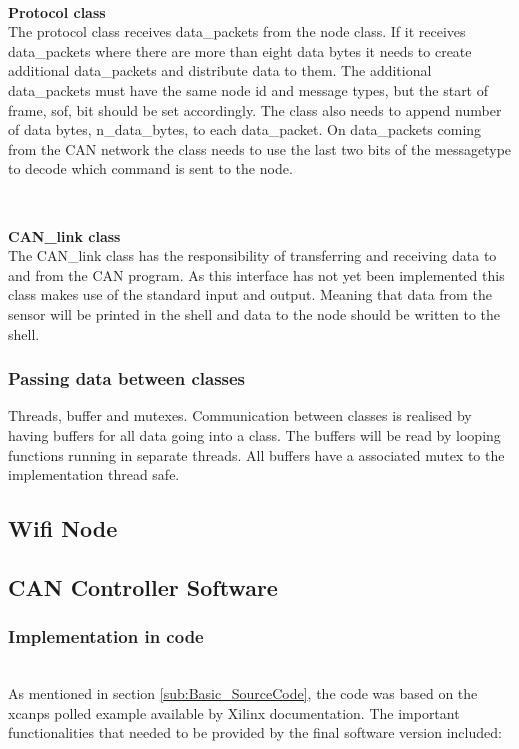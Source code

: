 ~\\ \par \textbf{Protocol class} ~ \\
The protocol class receives data\_packets from the node class. 
If it receives data\_packets where there are more than eight data bytes it needs to create additional data\_packets and distribute data to them. 
The additional data\_packets must have the same node id and message types, but the start of frame, sof, bit should be set accordingly.
The class also needs to append number of data bytes, n\_data\_bytes, to each data\_packet.
On data\_packets coming from the CAN network the class needs to use the last two bits of the messagetype to decode which command is sent to the node.

~\\ \par \textbf{CAN\_link class} ~ \\
The CAN\_link class has the responsibility of transferring and receiving data to and from the CAN program.
As this interface has not yet been implemented this class makes use of the standard input and output. 
Meaning that data from the sensor will be printed in the shell and data to the node should be written to the shell. 

\subsubsection*{Passing data between classes}
Threads, buffer and mutexes.
Communication between classes is realised by having buffers for all data going into a class.
The buffers will be read by looping functions running in separate threads.
All buffers have a associated mutex to the implementation thread safe.

\subsection{Wifi Node}


\subsection{CAN Controller Software}
\subsubsection{Implementation in code}~\\
As mentioned in section \ref{sub:Basic_SourceCode}, the code was based on the xcanps polled example available by Xilinx documentation.
The important functionalities that needed to be provided by the final software version included:

